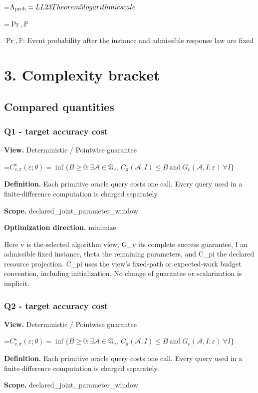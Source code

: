 \documentclass[10pt,a4paper]{article}
\newcommand{\AtlasMath}[1]{\par\begingroup\centering\setbox0=\hbox{$\displaystyle #1$}\ifdim\wd0>1.4\linewidth\typeout{ATLAS WIDE FORMULA: \the\wd0}\fi\ifdim\wd0>\linewidth\resizebox{\linewidth}{!}{\box0}\else\box0\fi\par\endgroup}
\newcommand{\AtlasInlineMath}[1]{\begingroup\setbox0=\hbox{$#1$}\ifdim\wd0>.4\linewidth\endgroup\AtlasMath{#1}\else\endgroup$#1$\fi}
\begin{document}
\AtlasMath{\Lambda_{\rm prob}=LL23 Theorem 5 logarithmic scale}


\AtlasInlineMath{\Pr,\mathbb{P}}: Event probability after the instance and admissible response law are fixed

\section{3. Complexity bracket}
\subsection{Compared quantities}
\subsubsection{Q1 - target accuracy cost}
\textbf{View.} Deterministic / Pointwise guarantee

\AtlasMath{C^\star_{v,\pi}(\varepsilon;\theta)=\inf\{B\ge0:\exists\mathcal A\in\mathfrak A_v,\ C_\pi(\mathcal A,I)\le B\ \text{and}\ G_v(\mathcal A,I;\varepsilon)\ \forall I\}}
\textbf{Definition.} Each primitive oracle query costs one call. Every query used in a finite-difference computation is charged separately.

\textbf{Scope.} declared\_joint\_parameter\_window

\textbf{Optimization direction.} minimize

Here v is the selected algorithm view, G\_v its complete success guarantee, I an admissible fixed instance, theta the remaining parameters, and C\_pi the declared resource projection. C\_pi uses the view's fixed-path or expected-work budget convention, including initialization. No change of guarantee or scalarization is implicit.

\subsubsection{Q2 - target accuracy cost}
\textbf{View.} Deterministic / Pointwise guarantee

\AtlasMath{C^\star_{v,\pi}(\varepsilon;\theta)=\inf\{B\ge0:\exists\mathcal A\in\mathfrak A_v,\ C_\pi(\mathcal A,I)\le B\ \text{and}\ G_v(\mathcal A,I;\varepsilon)\ \forall I\}}
\textbf{Definition.} Each primitive oracle query costs one call. Every query used in a finite-difference computation is charged separately.

\textbf{Scope.} declared\_joint\_parameter\_window
\end{document}
